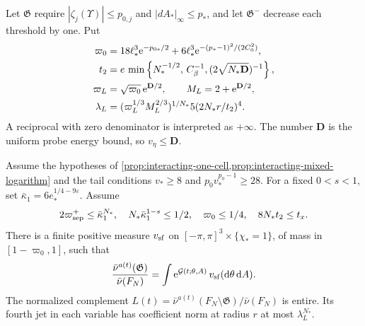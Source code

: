 Let $\mathfrak G$ require
$|\zeta_j(\Upsilon)|\le p_{0,j}$
and $|dA_*|_\infty\le p_*$, and let
$\mathfrak G^-$ decrease each threshold by one.
Put
\begin{align}
 \varpi_0&=18\ell_*^3\mathrm e^{-p_{0*}/2}
               +6\ell_*^3\mathrm e^{-(p_*-1)^2/(2C_0^2)},\notag\\
 t_2&=e\,\min\left\{N_*^{-1/2},\,C_\beta^{-1},
                                     (2\sqrt{N_*\mathbf D})^{-1}\right\},\notag\\
 \varpi_L&=\sqrt{\varpi_0}\,\mathrm e^{\mathbf D/2},
 \qquad M_L=2+\mathrm e^{\mathbf D/2},\notag\\
 \lambda_L&=(\varpi_L^{1/3}M_L^{2/3})^{1/N_*}
                              5(2N_*r/t_2)^4 .
                                     \label{eq:interacting-complement-constants}
\end{align}
A reciprocal with zero denominator is interpreted
as $+\infty$. The number $\mathbf D$ is the
uniform probe energy bound, so $v_\eta\le\mathbf D$.

\begin{proposition}\label{prop:interacting-complement}
Assume the hypotheses of \cref{prop:interacting-one-cell,prop:interacting-mixed-logarithm}
and the tail conditions $v_*\ge8$ and $p_0v_*^{p_0-1}\ge28$.
For a fixed $0<s<1$, set
$\bar\kappa_1=6e_*^{1/4-9\varepsilon}$.
Assume
\begin{equation}\label{eq:interacting-jet-conditions}
 2\varpi_{\rm sep}^+\le\bar\kappa_1^{N_*},\quad
 N_*\bar\kappa_1^{1-s}\le1/2,\quad
 \varpi_0\le1/4,\quad 8N_*t_2\le t_x .
\end{equation}
There is a finite positive measure $v_{\rm sf}$
on $[-\pi,\pi]^3\times\{\chi_*=1\}$, of
mass in $[1-\varpi_0,1]$, such that
\begin{equation}\label{eq:interacting-small-field-representation}
 \frac{\bar\nu^{a(t)}(\mathfrak G)}{\bar\nu(F_N)}
       =\int \mathrm e^{\mathcal G(t;\theta,A)}\,v_{\rm sf}(\mathrm d\theta\,\mathrm d A).
\end{equation}
The normalized complement
$L(t)=\bar\nu^{a(t)}(F_N\setminus\mathfrak G)/\bar\nu(F_N)$
is entire. Its fourth jet in each variable has
coefficient norm at radius $r$ at most
$\lambda_L^{N_*}$.
\end{proposition}

